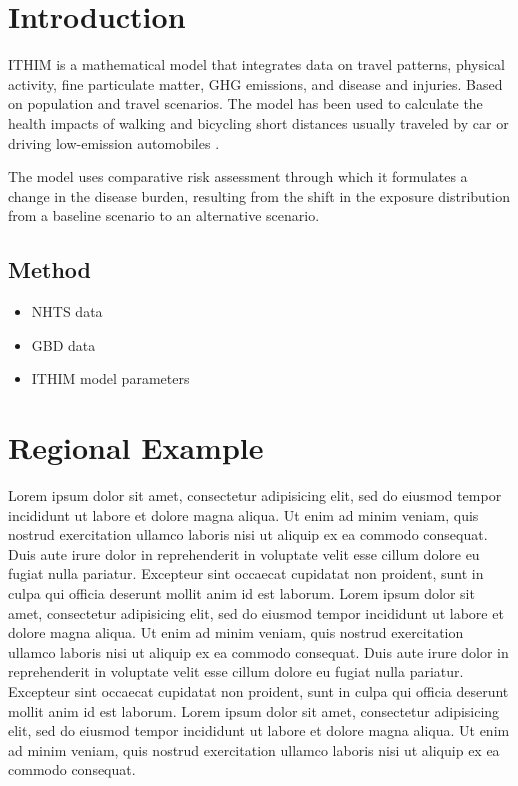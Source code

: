 \documentclass{bioinfo}
\begin{document}
\section{Introduction}

ITHIM is a mathematical model that integrates data on travel patterns,
physical activity, fine particulate matter, GHG emissions, and disease
and injuries. Based on population and travel scenarios. The model has
been used to calculate the health impacts of walking and bicycling
short distances usually traveled by car or driving low-emission
automobiles \cite{woodcock2013}.

The model uses comparative risk assessment through which it formulates
a change in the disease burden, resulting from the shift in the
exposure distribution from a baseline scenario to an alternative
scenario.

\begin{methods}
\section{Method}

\begin{itemize}
\item NHTS data
\item GBD data
\item ITHIM model parameters
\end{itemize}

\end{methods}

\section{Regional Example}

Lorem ipsum dolor sit amet, consectetur adipisicing elit, sed do
eiusmod tempor incididunt ut labore et dolore magna aliqua. Ut enim ad
minim veniam, quis nostrud exercitation ullamco laboris nisi ut
aliquip ex ea commodo consequat. Duis aute irure dolor in
reprehenderit in voluptate velit esse cillum dolore eu fugiat nulla
pariatur. Excepteur sint occaecat cupidatat non proident, sunt in
culpa qui officia deserunt mollit anim id est laborum. Lorem ipsum
dolor sit amet, consectetur adipisicing elit, sed do eiusmod tempor
incididunt ut labore et dolore magna aliqua. Ut enim ad minim veniam,
quis nostrud exercitation ullamco laboris nisi ut aliquip ex ea
commodo consequat. Duis aute irure dolor in reprehenderit in voluptate
velit esse cillum dolore eu fugiat nulla pariatur. Excepteur sint
occaecat cupidatat non proident, sunt in culpa qui officia deserunt
mollit anim id est laborum. Lorem ipsum dolor sit amet, consectetur
adipisicing elit, sed do eiusmod tempor incididunt ut labore et dolore
magna aliqua. Ut enim ad minim veniam, quis nostrud exercitation
ullamco laboris nisi ut aliquip ex ea commodo consequat.
\end{document}
